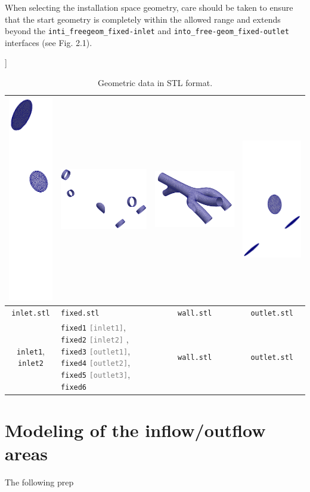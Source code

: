 \documentclass[a4paper,oneside]{book}
\numberwithin{equation}{section}
\begin{document}
When selecting the installation space geometry, care should be taken to ensure that the start geometry is completely within the allowed range and extends beyond the \verb|inti_freegeom_fixed-inlet| and \verb|into_free-geom_fixed-outlet| interfaces (see Fig. 2.1).

\begin{table}[!htbp]]
    \centering
    \begin{tabular}{|c|p{8cm}|c|c|} %
        \hline
        \includegraphics[scale=0.4]{M23in.png} & \includegraphics[scale=0.1]{M23fixed.png} &   \includegraphics[scale=0.1]{M23wall.png} &   \includegraphics[scale=0.4]{M23out.png} \\
        \hline
        \textcolor{dred}{\texttt{inlet.stl}} & \textcolor{dgreen}{\texttt{fixed.stl}} & \texttt{wall.stl} &  \textcolor{dblue}{\texttt{outlet.stl}} \\
        \hline
        \textcolor{dred}{\texttt{inlet1}}, \textcolor{dred}{\texttt{inlet2}} &  
        \textcolor{dgreen}{\texttt{fixed1}} \textcolor{gray}{\texttt{[inlet1]}},  \textcolor{dgreen}{\texttt{fixed2}} \textcolor{gray}{\texttt{[inlet2]}} ,
        \textcolor{dgreen}{\texttt{fixed3}} \textcolor{gray}{\texttt{[outlet1]}},  \textcolor{dgreen}{\texttt{fixed4}} \textcolor{gray}{\texttt{[outlet2]}},
        \textcolor{dgreen}{\texttt{fixed5}} \textcolor{gray}{\texttt{[outlet3]}},  \textcolor{dgreen}{\texttt{fixed6}}
        & \texttt{wall.stl} & \textcolor{dblue}{\texttt{outlet.stl}} \\
        \hline
    \end{tabular}
    \caption{Geometric data in STL format.}\label{tab:stlData1}
\end{table}


%

\section{Modeling of the inflow/outflow areas}
The following prep
\end{document}

